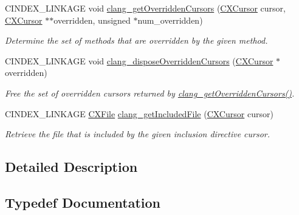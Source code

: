 \begin{DoxyCompactItemize}
C\+I\+N\+D\+E\+X\+\_\+\+L\+I\+N\+K\+A\+GE void \hyperlink{group__CINDEX__CURSOR__MANIP_gac308b03420c550e00c61153dc63deac8}{clang\+\_\+get\+Overridden\+Cursors} (\hyperlink{structCXCursor}{C\+X\+Cursor} cursor, \hyperlink{structCXCursor}{C\+X\+Cursor} $\ast$$\ast$overridden, unsigned $\ast$num\+\_\+overridden)
\begin{DoxyCompactList}\small\item\em Determine the set of methods that are overridden by the given method. \end{DoxyCompactList}\item 
\mbox{\label{group__CINDEX__CURSOR__MANIP_gac8f259af871b3f34ca7150703f8aaaa8}} 
C\+I\+N\+D\+E\+X\+\_\+\+L\+I\+N\+K\+A\+GE void \hyperlink{group__CINDEX__CURSOR__MANIP_gac8f259af871b3f34ca7150703f8aaaa8}{clang\+\_\+dispose\+Overridden\+Cursors} (\hyperlink{structCXCursor}{C\+X\+Cursor} $\ast$overridden)
\begin{DoxyCompactList}\small\item\em Free the set of overridden cursors returned by {\ttfamily \hyperlink{group__CINDEX__CURSOR__MANIP_gac308b03420c550e00c61153dc63deac8}{clang\+\_\+get\+Overridden\+Cursors()}}. \end{DoxyCompactList}\item 
\mbox{\label{group__CINDEX__CURSOR__MANIP_gaf61979977343e39f21d6ea0b22167514}} 
C\+I\+N\+D\+E\+X\+\_\+\+L\+I\+N\+K\+A\+GE \hyperlink{group__CINDEX__FILES_gacfcea9c1239c916597e2e5b3e109215a}{C\+X\+File} \hyperlink{group__CINDEX__CURSOR__MANIP_gaf61979977343e39f21d6ea0b22167514}{clang\+\_\+get\+Included\+File} (\hyperlink{structCXCursor}{C\+X\+Cursor} cursor)
\begin{DoxyCompactList}\small\item\em Retrieve the file that is included by the given inclusion directive cursor. \end{DoxyCompactList}\end{DoxyCompactItemize}


\subsection{Detailed Description}


\subsection{Typedef Documentation}
\mbox{\label{group__CINDEX__CURSOR__MANIP_ga0b3c1f89b3a9bf57c567884e7ebe41c4}} 
